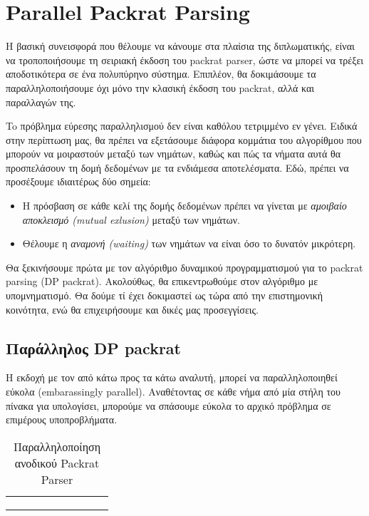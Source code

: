 \chapter{ Parallel Packrat Parsing }
\label{ch:parallel}

Η βασική συνεισφορά που θέλουμε να κάνουμε στα πλαίσια της διπλωματικής, είναι να τροποποιήσουμε τη σειριακή έκδοση του packrat parser, ώστε να μπορεί να τρέξει αποδοτικότερα σε ένα πολυπύρηνο σύστημα.
Επιπλέον, θα δοκιμάσουμε τα παραλληλοποιήσουμε όχι μόνο την κλασική έκδοση του packrat, αλλά και παραλλαγών της.

To πρόβλημα εύρεσης παραλληλισμού δεν είναι καθόλου τετριμμένο εν γένει. 
Ειδικά στην περίπτωση μας, θα πρέπει να εξετάσουμε διάφορα κομμάτια του αλγορίθμου που μπορούν να μοιραστούν μεταξύ των νημάτων, καθώς και πώς τα νήματα αυτά θα προσπελάσουν τη δομή δεδομένων με τα ενδιάμεσα αποτελέσματα.
Εδώ, πρέπει να προσέξουμε ιδιαιτέρως δύο σημεία:

\begin{itemize}
	\item Η πρόσβαση σε κάθε κελί της δομής δεδομένων πρέπει να γίνεται με \textit{αμοιβαίο αποκλεισμό (mutual exlusion)} μεταξύ των νημάτων.
	\item Θέλουμε η \textit{αναμονή (waiting)} των νημάτων να είναι όσο το δυνατόν μικρότερη.
\end{itemize}

Θα ξεκινήσουμε πρώτα με τον αλγόριθμο δυναμικού προγραμματισμού για το packrat parsing (DP packrat).
Ακολούθως, θα επικεντρωθούμε στον αλγόριθμο με υπομνηματισμό.
Θα δούμε τί έχει δοκιμαστεί ως τώρα από την επιστημονική κοινότητα, ενώ θα επιχειρήσουμε και δικές μας προσεγγίσεις.

\section{Παράλληλος DP packrat}

Η εκδοχή με τον από κάτω προς τα κάτω αναλυτή, μπορεί να παραλληλοποιηθεί εύκολα (embarassingly parallel). 
Αναθέτοντας σε κάθε νήμα από μία στήλη του πίνακα για υπολογίσει, μπορούμε να σπάσουμε εύκολα το αρχικό πρόβλημα σε επιμέρους υποπροβλήματα.

\begin{table}[ht]
\begin{center}
  \begin{tabular}{|c|c|c|g|g|g|g|c|c|}
    \hline
     & & & & & & & &  \\ \hline \hline
     & & & & & & & &  \\ \hline \hline
     & & & & & & & &  \\ \hline \hline
     & & & & & & & &  \\ \hline
  \end{tabular}
\end{center}
\caption{Παραλληλοποίηση ανοδικού Packrat Parser}
    \label{tab:bottom_up}
\end{table}

